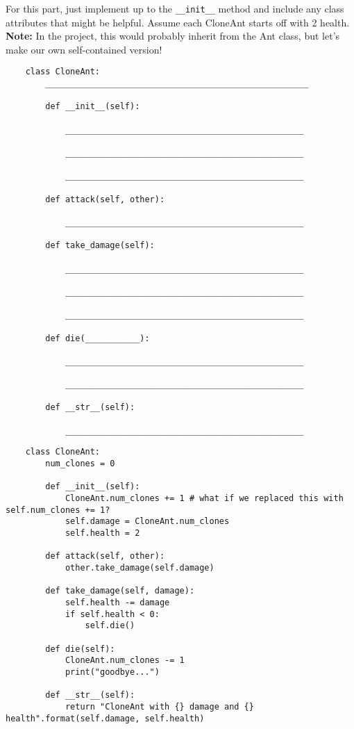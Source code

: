 \question For this part, just implement up to the \texttt{\_\_init\_\_} method and include any class attributes that might be helpful. Assume each CloneAnt starts off with 2 health. 
    \textbf{Note:} In the project, this would probably inherit from the Ant class, but let's make our own self-contained version!
    \newpage
    \begin{lstlisting}
    class CloneAnt:
        _____________________________________________________

        def __init__(self):

            ________________________________________________

            ________________________________________________

            ________________________________________________

        def attack(self, other):

            ________________________________________________

        def take_damage(self):

            ________________________________________________

            ________________________________________________

            ________________________________________________

        def die(___________):

            ________________________________________________

            ________________________________________________

        def __str__(self):
           
            ________________________________________________
    \end{lstlisting}

    \begin{solution}
    \begin{lstlisting}
    class CloneAnt:
        num_clones = 0 

        def __init__(self):
            CloneAnt.num_clones += 1 # what if we replaced this with self.num_clones += 1?
            self.damage = CloneAnt.num_clones
            self.health = 2

        def attack(self, other):
            other.take_damage(self.damage)

        def take_damage(self, damage):
            self.health -= damage
            if self.health < 0:
                self.die()

        def die(self):
            CloneAnt.num_clones -= 1
            print("goodbye...")

        def __str__(self):
            return "CloneAnt with {} damage and {} health".format(self.damage, self.health)
    \end{lstlisting}
    \end{solution}

